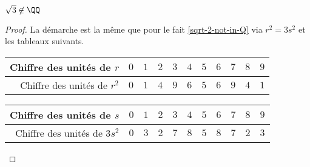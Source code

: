 \begin{fact}
	$\sqrt3 \not\in \QQ$
\end{fact}

\begin{proof}
	La démarche est la même que pour le fait \ref{sqrt-2-not-in-Q} via $r^2 = 3 s^2$ et les tableaux suivants.
	
	\begin{center}
		\begin{tabular}{|r|c|c|c|c|c|c|c|c|c|c|}
			\hline
			Chiffre des unités de $r$
			  & $0$  &  $1$  &  $2$  &  $3$  &  $4$  &  $5$  &  $6$  &  $7$  &  $8$  &  $9$
			\\ \hline
			\phantom{$3$}Chiffre des unités de $r^2$
			  & $0$  &  $1$  &  $4$  &  $9$  &  $6$  &  $5$  &  $6$  &  $9$  &  $4$  &  $1$
			\\ \hline
		\end{tabular}

		\medskip
		
		\begin{tabular}{|r|c|c|c|c|c|c|c|c|c|c|}
			\hline
			Chiffre des unités de $s$
			  & $0$  &  $1$  &  $2$  &  $3$  &  $4$  &  $5$  &  $6$  &  $7$  &  $8$  &  $9$
			\\ \hline
			Chiffre des unités de $3 s^2$
			  & $0$  &  $3$  &  $2$  &  $7$  &  $8$  &  $5$  &  $8$  &  $7$  &  $2$  &  $3$
			\\ \hline
		\end{tabular}
	\end{center}
\end{proof}
